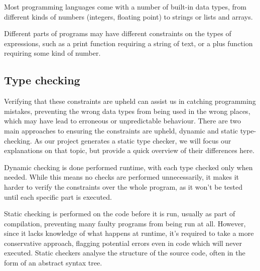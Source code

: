 \documentclass[nofilelist]{cslthse-msc}
\newcommand{\CR}[1]{\textcolor{green!60!black}{[\textbf{CR}:#1]}}
\begin{document}
Most programming languages come with a number of built-in data types, from different kinds of numbers (integers, floating point) to strings or lists and arrays.

Different parts of programs may have different constraints on the types of expressions, such as a print function requiring a string of text, or a plus function requiring some kind of number.

\subsection{Type checking}
Verifying that these constraints are upheld can assist us in catching programming mistakes, preventing the wrong data types from being used in the wrong places, which may have lead to erroneous or unpredictable behaviour.
There are two main approaches to ensuring the constraints are upheld, dynamic and static type-checking.
As our project generates a static type checker, we will focus our explanations on that topic, but provide a quick overview of their differences here.

Dynamic checking is done performed runtime, with each type checked only when needed.
While this means no checks are performed unnecessarily, it makes it harder to verify the constraints over the whole program, as it won't be tested until each specific part is executed.

Static checking is performed on the code before it is run, usually as part of compilation, preventing many faulty programs from being run at all.
However, since it lacks knowledge of what happens at runtime, it's required to take a more conservative approach, flagging potential errors even in code which will never executed.
Static checkers analyse the structure of the source code, often in the form of an abstract syntax tree.

\end{document}
